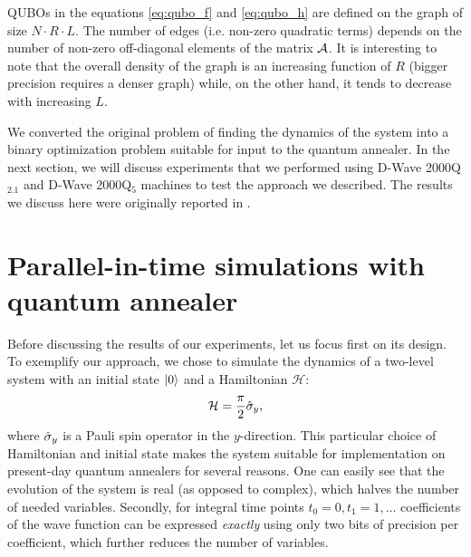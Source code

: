 QUBOs in the equations \eqref{eq:qubo_f} and \eqref{eq:qubo_h} are defined on
the graph of size $N \cdot R \cdot L$. The number of edges (i.e. non-zero
quadratic terms) depends on the number of non-zero off-diagonal elements of the
matrix $\mathcal{A}$. It is interesting to note that the overall density of the
graph is an increasing function of $R$ (bigger precision requires a denser
graph) while, on the other hand, it tends to decrease with increasing $L$.

We converted the original problem of finding the dynamics of the system into a
binary optimization problem suitable for input to the quantum annealer. In the
next section, we will discuss experiments that we performed using D-Wave
2000Q$_{2.1}$ and D-Wave 2000Q$_5$ machines to test the approach we described.
The results we discuss here were originally reported in \cite{parallelintime}.

\section{Parallel-in-time simulations with quantum annealer}
\label{sec:parallel-in-time}
Before discussing the results of our experiments, let us focus first on its
design. To exemplify our approach, we chose to simulate the dynamics of a
two-level system with an initial state $\ket{0}$ and a Hamiltonian $\mathcal{H}$:
\begin{equation}
  \mathcal{H} = \frac{\pi}{2}\hat{\sigma}_y,
\end{equation}
where $\hat{\sigma}_y$ is a Pauli spin operator in the $y$-direction. This particular
choice of Hamiltonian and initial state makes the system suitable for
implementation on present-day quantum annealers for several reasons. One can
easily see that the evolution of the system is real (as opposed to complex),
which halves the number of needed variables. Secondly, for integral time points
$t_0=0, t_1=1, \ldots$ coefficients of the wave function can be expressed
\emph{exactly} using only two bits of precision per coefficient, which further
reduces the number of variables.

